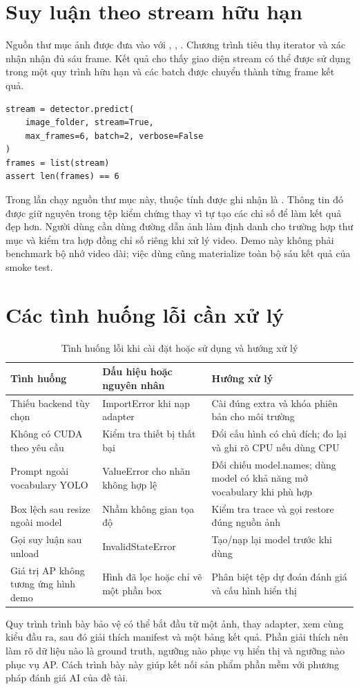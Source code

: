 \section{Suy luận theo stream hữu hạn}
Nguồn thư mục ảnh được đưa vào  với , , . Chương trình tiêu thụ iterator và xác nhận nhận đủ sáu frame. Kết quả cho thấy giao diện stream có thể được sử dụng trong một quy trình hữu hạn và các batch được chuyển thành từng frame kết quả.

\begin{lstlisting}[caption={Smoke test stream của thư mục ảnh}]
stream = detector.predict(
    image_folder, stream=True,
    max_frames=6, batch=2, verbose=False
)
frames = list(stream)
assert len(frames) == 6
\end{lstlisting}
Trong lần chạy nguồn thư mục này, thuộc tính  được ghi nhận là . Thông tin đó được giữ nguyên trong tệp kiểm chứng thay vì tự tạo các chỉ số để làm kết quả đẹp hơn. Người dùng cần dùng đường dẫn ảnh làm định danh cho trường hợp thư mục và kiểm tra hợp đồng chỉ số riêng khi xử lý video. Demo này không phải benchmark bộ nhớ video dài; việc dùng  cũng materialize toàn bộ sáu kết quả của smoke test.

\section{Các tình huống lỗi cần xử lý}
\begin{table}[H]\centering\small
\caption{Tình huống lỗi khi cài đặt hoặc sử dụng và hướng xử lý}
\begin{tabularx}{\textwidth}{p{4.2cm}YY}
\toprule Tình huống & Dấu hiệu hoặc nguyên nhân & Hướng xử lý \\\midrule
Thiếu backend tùy chọn & ImportError khi nạp adapter & Cài đúng extra và khóa phiên bản cho môi trường \\
Không có CUDA theo yêu cầu & Kiểm tra thiết bị thất bại & Đổi cấu hình có chủ đích; đo lại và ghi rõ CPU nếu dùng CPU \\
Prompt ngoài vocabulary YOLO & ValueError cho nhãn không hợp lệ & Đối chiếu model.names; dùng model có khả năng mở vocabulary khi phù hợp \\
Box lệch sau resize ngoài model & Nhầm không gian tọa độ & Kiểm tra trace và gọi restore đúng nguồn ảnh \\
Gọi suy luận sau unload & InvalidStateError & Tạo/nạp lại model trước khi dùng \\
Giá trị AP không tương ứng hình demo & Hình đã lọc hoặc chỉ vẽ một phần box & Phân biệt tệp dự đoán đánh giá và cấu hình hiển thị \\
\bottomrule
\end{tabularx}
\end{table}
Quy trình trình bày bảo vệ có thể bắt đầu từ một ảnh, thay adapter, xem cùng kiểu đầu ra, sau đó giải thích manifest và một bảng kết quả. Phần giải thích nên làm rõ dữ liệu nào là ground truth, ngưỡng nào phục vụ hiển thị và ngưỡng nào phục vụ AP. Cách trình bày này giúp kết nối sản phẩm phần mềm với phương pháp đánh giá AI của đề tài.

